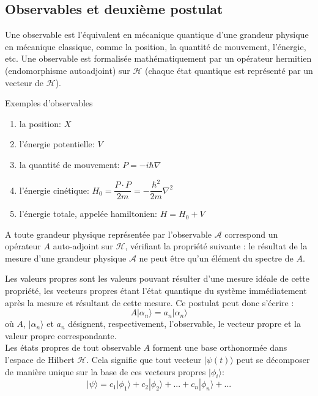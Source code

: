 \subsection{Observables et deuxième postulat}
Une observable est l'équivalent en mécanique quantique d'une grandeur physique en mécanique classique, comme la position, la quantité de mouvement, l'énergie, etc. Une observable est formalisée mathématiquement par un opérateur hermitien (endomorphisme autoadjoint) sur $\mathcal{H}$ (chaque état quantique est représenté par un vecteur de $\mathcal{H}$). 
\begin{ex}
	Exemples d'observables
	\begin{enumerate}
		\item la position: $X$
		\item l'énergie potentielle: $V$
		\item la quantité de mouvement: $P=-i\hbar \nabla$
		\item l'énergie cinétique:
		$H_0=\dfrac{P \cdot P}{2m}=-\dfrac{\hbar ^{2}}{2m}\nabla^{2}$
		\item l'énergie totale, appelée hamiltonien:
		$H=H_0+V$
	\end{enumerate}
\end{ex}
\begin{Post}
	A toute grandeur physique représentée par l'observable $\mathcal{A}$ correspond un opérateur $A$ auto-adjoint sur $\mathcal{H}$, vérifiant la propriété suivante : le résultat de la mesure d’une grandeur physique $\mathcal{A}$ ne peut être qu’un élément du spectre de $A$.
\end{Post}
Les valeurs propres sont les valeurs pouvant résulter d'une mesure idéale de cette propriété, les vecteurs propres étant l'état quantique du système immédiatement après la mesure et résultant de cette mesure. Ce postulat peut donc s'écrire :
$$
A|\alpha _{n}\rangle =a_{n}|\alpha _{n}\rangle 
$$
où $A$, $|\alpha_{n}\rangle$ et $a_n$ désignent, respectivement, l'observable, le vecteur propre et la valeur propre correspondante.\\
Les états propres de tout observable $A$ forment une base orthonormée dans l'espace de Hilbert $\mathcal{H}$.
Cela signifie que tout vecteur $|\psi (t)\rangle$ peut se décomposer de manière unique sur la base de ces vecteurs propres $|\phi_{i}\rangle$:
$$
|\psi \rangle =c_{1}|\phi _{1}\rangle +c_{2}|\phi _{2}\rangle +...+c_{n}|\phi _{n}\rangle +...
$$
